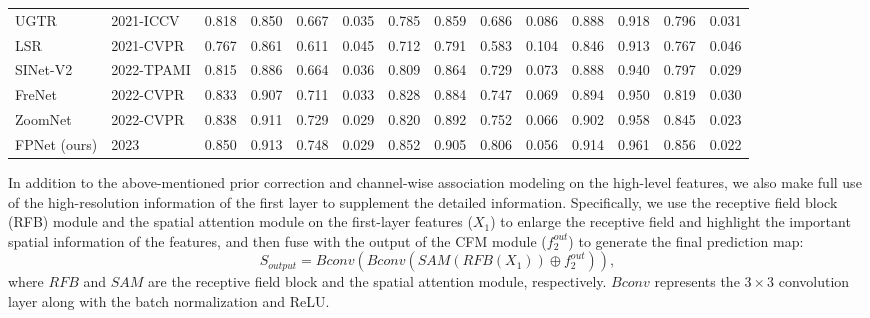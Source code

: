 \documentclass[sigconf,screen]{acmart}
\begin{document}
\begin{table*}[!t]
\begin{tabular}{l|l|llll|llll|llll}
UGTR      {\cite{r17}}            & 2021-ICCV             & 0.818     & 0.850     & 0.667     & 0.035    & 0.785    & 0.859    & 0.686    & 0.086    & 0.888    & 0.918    & 0.796   & 0.031   \\
LSR       {\cite{r38}}           & 2021-CVPR             & 0.767     & 0.861     & 0.611     & 0.045    & 0.712    & 0.791    & 0.583    & 0.104    & 0.846    & 0.913    & 0.767   & 0.046   \\
SINet-V2  {\cite{r53}}            & 2022-TPAMI             & 0.815     & 0.886     & 0.664     & 0.036    & 0.809    & 0.864    & 0.729    & 0.073    & 0.888    & 0.940    & 0.797   & 0.029   \\
FreNet    {\cite{r39}}            & 2022-CVPR             & \color{blue}0.833     &\color{blue} 0.907     & \color{blue}0.711     &\color{blue} 0.033    &\color{green} 0.828    & \color{blue}0.884    & \color{blue}0.747    &\color{blue} 0.069    & \color{blue}0.894    & \color{blue}0.950    & \color{blue}0.819   & \color{blue}0.030   \\
ZoomNet   {\cite{r55}}            & 2022-CVPR             & \color{green}0.838     &\color{green} 0.911     & \color{green}0.729     &\color{red} 0.029    & \color{blue}0.820    &\color{green} 0.892    & \color{green}0.752    & \color{green}0.066    & \color{green}0.902    & \color{green}0.958    &\color{green} 0.845   & \color{green}0.023   \\ \hline
FPNet (ours)                   & 2023                  & \color{red}0.850     &\color{red} 0.913     &\color{red} 0.748     & \color{red}0.029    & \color{red}0.852    & \color{red}0.905    & \color{red}0.806    &\color{red} 0.056    & \color{red}0.914    &\color{red} 0.961    & \color{red}0.856   &\color{red} 0.022   \\ \hline
\end{tabular}
\label{tab:all}
\end{table*}

In addition to the above-mentioned prior correction and channel-wise association modeling on the high-level features, we also make full use of the high-resolution information of the first layer to supplement the detailed information.
Specifically, we use the receptive field block (RFB) module \cite{r60} and the spatial attention module \cite{r63} on the first-layer features ($X_1$) to enlarge the receptive field and highlight the important spatial information of the features, and then fuse with the output of the CFM module ($f^{out}_2$) to generate the final prediction map:
\begin{equation}
    S_{output} = Bconv(Bconv(SAM(RFB(X_1))\oplus f^{out}_2)),
\end{equation}
where $RFB$ and $SAM$ are the receptive field block and the spatial attention module, respectively. $Bconv$ represents the $3 \times 3$ convolution layer along with the batch normalization and ReLU.
\end{document}
